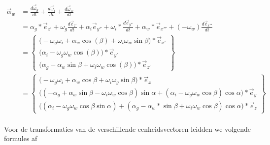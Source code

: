 \documentclass[a4paper,10pt]{article}
\begin{document}
\begin{equation}
\begin{aligned}
\vec{\alpha}_{w} &= \frac{d\vec{\omega}_{g}}{dt} + \frac{d\vec{\omega}_{i}}{dt} + \frac{d\vec{\omega}_{w}}{dt}\\
&= \alpha_g *  \vec{e}_{z'} + \omega_g  \frac{d\vec{e}_{z'}}{dt} + \alpha_i   \vec{e}_{y''} + \omega_i * \frac{d\vec{e}_{y''}}{dt} + \alpha_w * \vec{e}_{x'''} + (-\omega_w)  \frac{d\vec{e}_{x'''}}{dt}\\
&=\begin{Bmatrix}
\Big(- {\omega}_{g} {\omega}_{i} + \alpha_w\cos(\beta) +\omega_i\omega_w \sin{\beta} \Big)*\vec{e}_{x'} \\
\Big(\alpha_i - \omega_g\omega_w\cos(\beta)\Big)*\vec{e}_{y'}\\
\Big(\alpha_g  -\alpha_w\sin{\beta}+ \omega_i\omega_w\cos(\beta)\Big)*\vec{e}_{z'}
\end{Bmatrix}\\
&=\begin{Bmatrix}
\Big(- {\omega}_{g}  {\omega}_{i} + \alpha_w\cos{\beta} +\omega_i\omega_g\sin{\beta} \Big)* \vec{e}_{x} \\
\Big((-\alpha_g  +\alpha_w\sin{\beta}- \omega_i\omega_w\cos{\beta}) \sin{\alpha} + (\alpha_i - \omega_g\omega_w\cos{\beta})\cos{\alpha}  \Big) * \vec{e}_{y} \\
\Big((\alpha_i - \omega_g\omega_w\cos{\beta}\sin{\alpha}) + (\alpha_g  -\alpha_w*\sin{\beta}+ \omega_i\omega_w\cos{\beta}) \cos{\alpha} \Big) * \vec{e}_{z}
\end{Bmatrix}
\end{aligned}
\end{equation}\\
Voor de transformaties van de verschillende eenheidsvectoren leidden we volgende formules af \\
\end{document}
